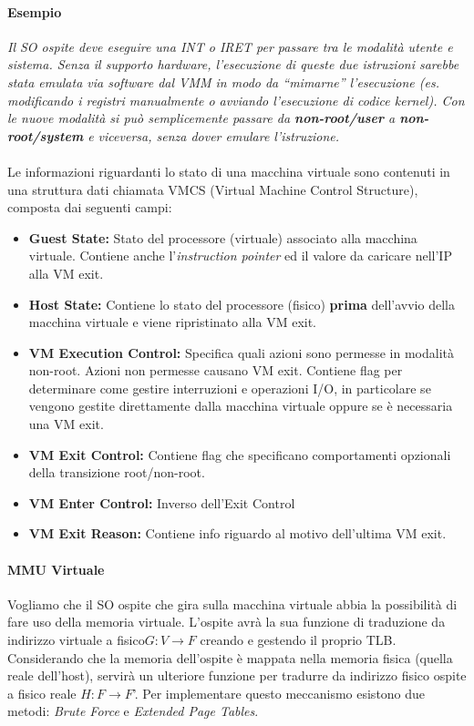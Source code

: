 \documentclass{article}
\begin{document}
\paragraph{Esempio} \textit{Il SO ospite deve eseguire una INT o IRET per passare tra le modalità utente e sistema. Senza il supporto hardware, l’esecuzione di queste due istruzioni sarebbe stata emulata via software dal VMM in modo da “mimarne” l’esecuzione (es. modificando i registri manualmente o avviando l’esecuzione di codice kernel).
Con le nuove modalità si può semplicemente passare da \textbf{non-root/user} a \textbf{non-root/system} e viceversa, senza dover emulare l’istruzione.}\\ \\
Le informazioni riguardanti lo stato di una macchina virtuale sono contenuti in una struttura dati chiamata VMCS (Virtual Machine Control Structure), composta dai seguenti campi:
\begin{itemize}
    \item \textbf{Guest State:} Stato del processore (virtuale) associato alla macchina virtuale. Contiene anche l’\textit{instruction pointer} ed il valore da caricare nell’IP alla VM exit.
    \item \textbf{Host State:} Contiene lo stato del processore (fisico) \textbf{prima} dell’avvio della macchina virtuale e viene ripristinato alla VM exit.
    \item \textbf{VM Execution Control:} Specifica quali azioni sono permesse in modalità non-root. Azioni non permesse causano VM exit.
Contiene flag per determinare come gestire interruzioni e operazioni I/O, in particolare se vengono gestite direttamente dalla macchina virtuale oppure se è necessaria una VM exit.
    \item \textbf{VM Exit Control:} Contiene flag che specificano comportamenti opzionali della transizione root/non-root.
    \item \textbf{VM Enter Control:} Inverso dell’Exit Control
    \item \textbf{VM Exit Reason:} Contiene info riguardo al motivo dell’ultima VM exit.
\end{itemize}
\paragraph{MMU Virtuale}
Vogliamo che il SO ospite che gira sulla macchina virtuale abbia la possibilità di fare uso della memoria virtuale. L’ospite avrà la sua funzione di traduzione da indirizzo virtuale a fisico\footnotemark \(G: V \longrightarrow F\) creando e gestendo il proprio TLB.\\
Considerando che la memoria dell’ospite è mappata nella memoria fisica (quella reale dell’host), servirà un ulteriore funzione per tradurre da indirizzo fisico ospite a fisico reale \(H: F \longrightarrow F\)'.
Per implementare questo meccanismo esistono due metodi: \textit{Brute Force} e \textit{Extended Page Tables}.
\end{document}
